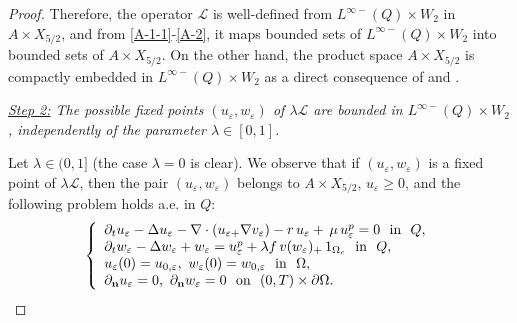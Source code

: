 \documentclass[11pt,reqno]{amsart}%
\numberwithin{equation}{section}
\begin{document}
{\begin{proof}
Therefore, the operator $\mathcal{L}$ is well-defined from $L^{\infty-}(Q)\times W_2$ in $A\times X_{5/2}$, and from \eqref{A-1-1}-\eqref{A-2}, it maps  bounded sets of $L^{\infty-}(Q)\times W_2$ into bounded sets of $A\times X_{5/2}$. On the other hand, the product space $A\times X_{5/2}$ is compactly embedded in $L^{\infty-}(Q)\times W_2$ as a direct consequence of \cite[Corollary 4]{Simon} and \cite[Th\'eor\`eme 5.1]{Lions}.%
\vspace{0.1cm}


{\it \underline{Step 2:} The possible fixed points $(u_\varepsilon,w_\varepsilon)$ of $\lambda \mathcal{L}$ are bounded in $L^{\infty-}(Q)\times W_2$, independently of the parameter $\lambda\in[0,1]$.
}

\vspace{0.1cm}

Let $\lambda\in(0,1]$ (the case $\lambda=0$ is clear). We observe that if $(u_\varepsilon,w_\varepsilon)$ is a fixed point of $\lambda \mathcal{L}$, then the pair $(u_\varepsilon,w_\varepsilon)$ belongs to $A\times X_{5/2}$, $u_\varepsilon\ge0$,  and the following problem holds  a.e. in $Q$: 
\begin{equation}\label{B}
\left\{
\begin{array}{l}
\partial_tu_\varepsilon-\Delta u_\varepsilon
-\nabla\cdot({u}_{\varepsilon+}\nabla v_\varepsilon)
-r\,  u_{\varepsilon} +\,\mu \,   u_{\varepsilon }^{p}=0
\ \mbox{ in }\ Q,\\
\partial_tw_\varepsilon-\Delta w_\varepsilon+w_\varepsilon
=  u_{\varepsilon}^{p}
+\lambda f\, {v}(w_{\varepsilon})_+\,1_{\Omega_c}\ \mbox{ in }\ Q,\\
u_\varepsilon(0)
= u_{0,\varepsilon},\ w_\varepsilon(0)
=w_{0,\varepsilon}\ \mbox{ in }\ \Omega,\\
{\partial_{\bf n} u_\varepsilon}=0,\ {\partial_{\bf n} w_\varepsilon}=0\ \mbox{ on }\  (0,T)\times\partial\Omega.
\end{array}
\right.
\end{equation}






\end{proof}}
\end{document}
